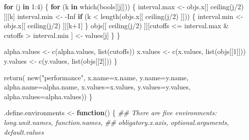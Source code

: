 \documentclass[
  letterpaper,
  DIV=11,
  numbers=noendperiod]{scrartcl}
\newenvironment{Shaded}{\begin{snugshade}}{\end{snugshade}}
\newcommand{\AttributeTok}[1]{\textcolor[rgb]{0.40,0.45,0.13}{#1}}
\newcommand{\ConstantTok}[1]{\textcolor[rgb]{0.56,0.35,0.01}{#1}}
\newcommand{\ControlFlowTok}[1]{\textcolor[rgb]{0.00,0.23,0.31}{\textbf{#1}}}
\newcommand{\DecValTok}[1]{\textcolor[rgb]{0.68,0.00,0.00}{#1}}
\newcommand{\DocumentationTok}[1]{\textcolor[rgb]{0.37,0.37,0.37}{\textit{#1}}}
\newcommand{\FunctionTok}[1]{\textcolor[rgb]{0.28,0.35,0.67}{#1}}
\newcommand{\NormalTok}[1]{\textcolor[rgb]{0.00,0.23,0.31}{#1}}
\newcommand{\OtherTok}[1]{\textcolor[rgb]{0.00,0.23,0.31}{#1}}
\newcommand{\SpecialCharTok}[1]{\textcolor[rgb]{0.37,0.37,0.37}{#1}}
\newcommand{\StringTok}[1]{\textcolor[rgb]{0.13,0.47,0.30}{#1}}
\begin{document}
\begin{Shaded}
\begin{Highlighting}[]
        \ControlFlowTok{for}\NormalTok{ (j }\ControlFlowTok{in} \DecValTok{1}\SpecialCharTok{:}\DecValTok{4}\NormalTok{) \{}
            \ControlFlowTok{for}\NormalTok{ (k }\ControlFlowTok{in} \FunctionTok{which}\NormalTok{(bools[[j]])) \{}
\NormalTok{                interval.max }\OtherTok{\textless{}{-}}\NormalTok{ objs.x[[ }\FunctionTok{ceiling}\NormalTok{(j}\SpecialCharTok{/}\DecValTok{2}\NormalTok{) ]][k]}
\NormalTok{                interval.min }\OtherTok{\textless{}{-}} \SpecialCharTok{{-}}\ConstantTok{Inf}
                \ControlFlowTok{if}\NormalTok{ (k }\SpecialCharTok{\textless{}} \FunctionTok{length}\NormalTok{(objs.x[[ }\FunctionTok{ceiling}\NormalTok{(j}\SpecialCharTok{/}\DecValTok{2}\NormalTok{) ]])) \{}
\NormalTok{                    interval.min }\OtherTok{\textless{}{-}}\NormalTok{ objs.x[[ }\FunctionTok{ceiling}\NormalTok{(j}\SpecialCharTok{/}\DecValTok{2}\NormalTok{) ]][k}\SpecialCharTok{+}\DecValTok{1}\NormalTok{]}
\NormalTok{                \}}
\NormalTok{                objs[[ }\FunctionTok{ceiling}\NormalTok{(j}\SpecialCharTok{/}\DecValTok{2}\NormalTok{) ]][cutoffs }\SpecialCharTok{\textless{}=}\NormalTok{ interval.max }\SpecialCharTok{\&}
\NormalTok{                                       cutoffs }\SpecialCharTok{\textgreater{}}\NormalTok{ interval.min ] }\OtherTok{\textless{}{-}}\NormalTok{ values[j]}
\NormalTok{            \}}
\NormalTok{        \}}

\NormalTok{        alpha.values }\OtherTok{\textless{}{-}} \FunctionTok{c}\NormalTok{(alpha.values, }\FunctionTok{list}\NormalTok{(cutoffs))}
\NormalTok{        x.values }\OtherTok{\textless{}{-}} \FunctionTok{c}\NormalTok{(x.values, }\FunctionTok{list}\NormalTok{(objs[[}\DecValTok{1}\NormalTok{]]))}
\NormalTok{        y.values }\OtherTok{\textless{}{-}} \FunctionTok{c}\NormalTok{(y.values, }\FunctionTok{list}\NormalTok{(objs[[}\DecValTok{2}\NormalTok{]]))}
\NormalTok{    \}}
    
    \FunctionTok{return}\NormalTok{( }\FunctionTok{new}\NormalTok{(}\StringTok{"performance"}\NormalTok{,}
                \AttributeTok{x.name=}\NormalTok{x.name, }\AttributeTok{y.name=}\NormalTok{y.name,}
                \AttributeTok{alpha.name=}\NormalTok{alpha.name, }\AttributeTok{x.values=}\NormalTok{x.values,}
                \AttributeTok{y.values=}\NormalTok{y.values, }\AttributeTok{alpha.values=}\NormalTok{alpha.values))}
\NormalTok{\}}

\NormalTok{.define.environments }\OtherTok{\textless{}{-}} \ControlFlowTok{function}\NormalTok{() \{}
    \DocumentationTok{\#\# There are five environments: long.unit.names, function.names,}
    \DocumentationTok{\#\# obligatory.x.axis, optional.arguments, default.values}
    

\end{Highlighting}
\end{Shaded}
\end{document}
